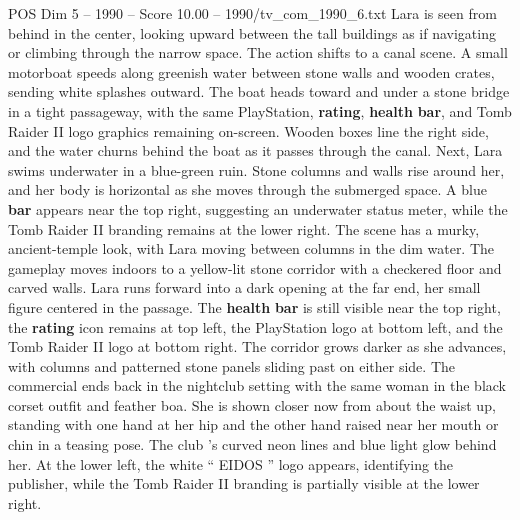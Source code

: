 \begin{textsample}{POS Dim 5 – 1990 – Score 10.00 – 1990/tv\_com\_1990\_6.txt}
Lara is seen from behind in the center, looking upward between the tall buildings as if navigating or climbing through the narrow space.
The action shifts to a canal scene.
A small motorboat speeds along greenish water between stone walls and wooden crates, sending white splashes outward.
The boat heads toward and under a stone bridge in a tight passageway, with the same PlayStation, \textbf{rating}, \textbf{health} \textbf{bar}, and Tomb Raider II logo graphics remaining on-screen.
Wooden boxes line the right side, and the water churns behind the boat as it passes through the canal.
Next, Lara swims underwater in a blue-green ruin.
Stone columns and walls rise around her, and her body is horizontal as she moves through the submerged space.
A blue \textbf{bar} appears near the top right, suggesting an underwater status meter, while the Tomb Raider II branding remains at the lower right.
The scene has a murky, ancient-temple look, with Lara moving between columns in the dim water.
The gameplay moves indoors to a yellow-lit stone corridor with a checkered floor and carved walls.
Lara runs forward into a dark opening at the far end, her small figure centered in the passage.
The \textbf{health} \textbf{bar} is still visible near the top right, the \textbf{rating} icon remains at top left, the PlayStation logo at bottom left, and the Tomb Raider II logo at bottom right.
The corridor grows darker as she advances, with columns and patterned stone panels sliding past on either side.
The commercial ends back in the nightclub setting with the same woman in the black corset outfit and feather boa.
She is shown closer now from about the waist up, standing with one hand at her hip and the other hand raised near her mouth or chin in a teasing pose.
The club ’s curved neon lines and blue light glow behind her.
At the lower left, the white “ EIDOS ” logo appears, identifying the publisher, while the Tomb Raider II branding is partially visible at the lower right.

\end{textsample}
